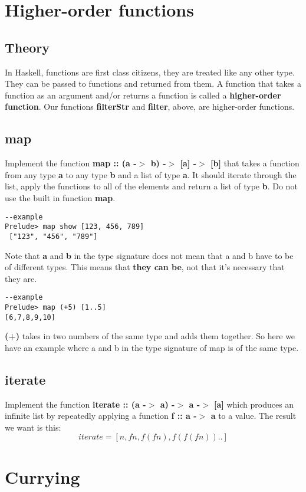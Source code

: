 \documentclass{article}
\begin{document}
\section{Higher-order functions}
\subsection{Theory}
In Haskell, functions are first class citizens, they are treated like any other type. They can be passed to functions and returned from them. A function that takes a function as an argument and/or returns a function is called a \textbf{higher-order function}. Our functions \textbf{filterStr} and \textbf{filter}, above, are higher-order functions.

\subsection{map}
Implement the function \textbf{map :: (a -$>$ b) -$>$ [a] -$>$ [b]} that takes a function from any type \textbf{a} to any type \textbf{b} and a list of type \textbf{a}. It should iterate through the list, apply the functions to all of the elements and return a list of type \textbf{b}. Do not use the built in function \textbf{map}.
\lstset{language=Haskell}
\begin{lstlisting}
--example
Prelude> map show [123, 456, 789]
 ["123", "456", "789"]
\end{lstlisting}
Note that \textbf{a} and \textbf{b} in the type signature does not mean that a and b have to be of different types. This means that \textbf{they can be}, not that it's necessary that they are.
\lstset{language=Haskell}
\begin{lstlisting}
--example
Prelude> map (+5) [1..5]
[6,7,8,9,10]
\end{lstlisting}
\textbf{(+)} takes in two numbers of the same type and adds them together. So here we have an example where a and b in the type signature of map is of the same type.

\subsection{iterate}
Implement the function \textbf{iterate :: (a -$>$ a)  -$>$ a -$>$ [a]} which produces an infinite list by repeatedly applying a function \textbf{f :: a -$>$ a} to a value. The result we want is this:
\[iterate = [n, f n, f (f n), f (f (f n))..]\]

\section{Currying}
\end{document}
